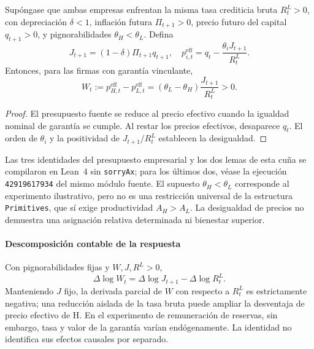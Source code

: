 \begin{proposition}
\label{prop:compact_source_collateral_effective_wedge}
Supóngase que ambas empresas enfrentan la misma tasa
crediticia bruta $R_t^L>0$, con depreciación $\delta<1$,
inflación futura $\Pi_{t+1}>0$, precio futuro del capital
$q_{t+1}>0$, y pignorabilidades
$\theta_H<\theta_L$. Defina
\[
J_{t+1}=(1-\delta)\Pi_{t+1}q_{t+1},
\quad
p_{i,t}^{\mathrm{eff}}
=q_t-\frac{\theta_iJ_{t+1}}{R_t^L}.
\]
Entonces, para las firmas con garantía vinculante,
\[
W_t:=p_{H,t}^{\mathrm{eff}}-p_{L,t}^{\mathrm{eff}}
=(\theta_L-\theta_H)\frac{J_{t+1}}{R_t^L}>0.
\]
\end{proposition}
\begin{proof}
El presupuesto fuente se reduce al precio efectivo
cuando la igualdad nominal de garantía se cumple.
Al restar los precios efectivos, desaparece $q_t$.
El orden de $\theta_i$ y la positividad de
$J_{t+1}/R_t^L$ establecen la desigualdad.
\end{proof}
Las tres identidades del presupuesto empresarial y los
dos lemas de esta cuña se compilaron en Lean~4 sin
\texttt{sorryAx}; para los últimos dos, véase la ejecución
\texttt{42919617934} del mismo módulo fuente.
El supuesto $\theta_H<\theta_L$ corresponde al experimento
ilustrativo, pero no es una restricción universal de la
estructura \texttt{Primitives}, que sí exige productividad
$A_H>A_L$. La desigualdad de precios no demuestra
una asignación relativa determinada ni bienestar superior.

\paragraph{Descomposición contable de la respuesta}
Con pignorabilidades fijas y $W,J,R^L>0$,
\[
\Delta\log W_t
=\Delta\log J_{t+1}-\Delta\log R_t^L.
\]
Manteniendo $J$ fijo, la derivada parcial de $W$ con
respecto a $R_t^L$ es estrictamente negativa; una reducción
aislada de la tasa bruta puede ampliar la desventaja
de precio efectivo de H. En el experimento de remuneración
de reservas, sin embargo, tasa y valor de la garantía
varían endógenamente. La identidad no identifica sus
efectos causales por separado.

